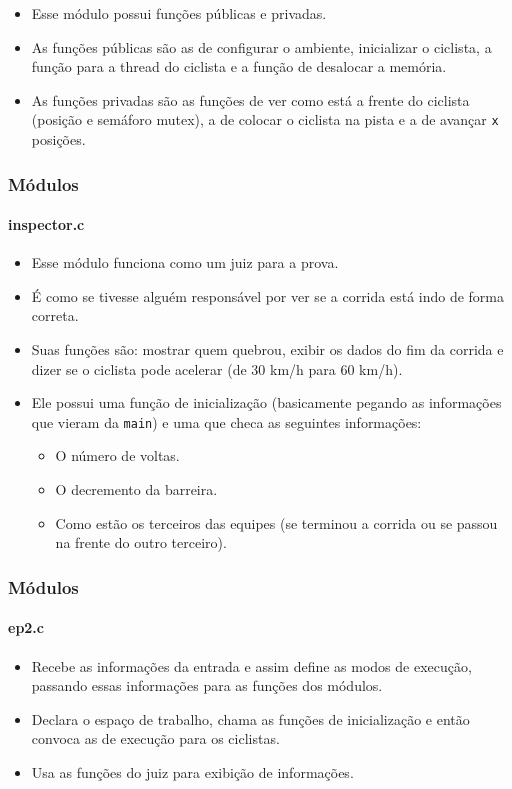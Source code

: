 \documentclass{beamer}
\begin{document}
\begin{frame}
	\begin{itemize}
		\item Esse módulo possui funções públicas e privadas.
		\item As funções públicas são as de configurar o ambiente, inicializar o ciclista, a função para a thread do ciclista e a função de desalocar a memória.
		\item As funções privadas são as funções de ver como está a frente do ciclista (posição e semáforo mutex), a de colocar o ciclista na pista e a de avançar \texttt{x} posições. 
	\end{itemize}
\end{frame}

\begin{frame}
	\frametitle{Módulos}
	\framesubtitle{inspector.c}
	\begin{itemize}
		\item Esse módulo funciona como um juiz para a prova.
		\item É como se tivesse alguém responsável por ver se a corrida está indo de forma correta.
		\item Suas funções são: mostrar quem quebrou, exibir os dados do fim da corrida e dizer se o ciclista pode acelerar (de 30 km/h para 60 km/h).
		\item Ele possui uma função de inicialização (basicamente pegando as informações que vieram da \texttt{main}) e uma que checa as seguintes informações:
		\begin{itemize}
			\item O número de voltas.
			\item O decremento da barreira.
			\item Como estão os terceiros das equipes (se terminou a corrida ou se passou na frente do outro terceiro).
		\end{itemize}
	\end{itemize}	
\end{frame}

\begin{frame}
	\frametitle{Módulos}
	\framesubtitle{ep2.c}
	\begin{itemize}
		\item Recebe as informações da entrada e assim define as modos de execução, passando essas informações para as funções dos módulos.
		\item Declara o espaço de trabalho, chama as funções de inicialização e então convoca as de execução para os ciclistas.
		\item Usa as funções do juiz para exibição de informações.
	\end{itemize}	
\end{frame}
\end{document}
